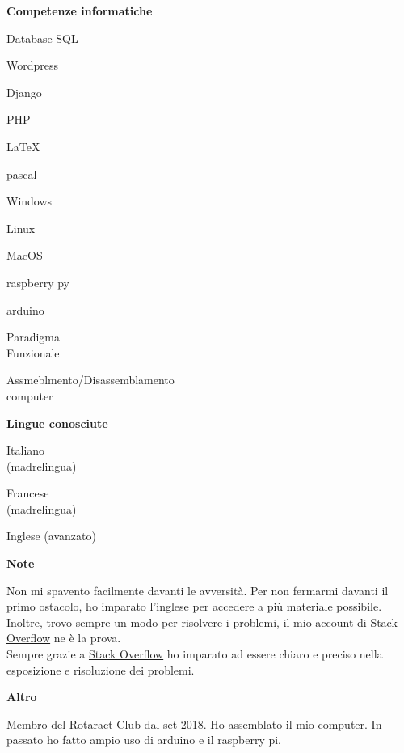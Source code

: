 \documentclass[a4paper,12pt,final]{memoir}
\newcommand{\Sep}{\vspace{1.5em}}
\newcommand{\SmallSep}{\vspace{0.5em}}
\newcommand{\CVSection}[1]
	{\Large\textbf{#1}\par
	\SmallSep\normalsize\normalfont}
\newcommand{\CVItem}[1]
	{\textbf{\color{RoyalBlue} #1}}
\begin{document}
\CVItem{Competenze informatiche}
\begin{multicols}{3}
\begin{compactitem}[\color{RoyalBlue}$\circ$]
	\item Database SQL
	\item Wordpress
	\item Django
	\item PHP
	\item \LaTeX
	\item pascal
	\item Windows
	\item Linux
	\item MacOS
	\item raspberry py
	\item arduino
	\item Paradigma\\Funzionale
	\item Assmeblmento/Disassemblamento\\computer
\end{compactitem}
\end{multicols}
\SmallSep

\clearpage
\framebreak
\framebreak

\CVItem{Lingue conosciute}
\begin{multicols}{3}
\begin{compactitem}[\color{RoyalBlue}$\circ$]
	\item Italiano\\(madrelingua)
	\item Francese\\(madrelingua)
	\item Inglese (avanzato)
\end{compactitem}
\end{multicols}
\Sep 

\CVSection{Note}
	Non mi spavento facilmente davanti le avversità.
	Per non fermarmi davanti il primo ostacolo, ho imparato l'inglese per accedere a più materiale possibile.
	\\Inoltre, trovo sempre un modo per risolvere i problemi, il mio account di \href{https://stackoverflow.com/users/6875945/mattia-rubini}{Stack Overflow} ne è la prova.
	\\Sempre grazie a \href{https://stackoverflow.com/users/6875945/mattia-rubini}{Stack Overflow} ho imparato ad essere chiaro e preciso nella esposizione e risoluzione dei problemi.

\CVSection{Altro}
	Membro del Rotaract Club dal set 2018.
	Ho assemblato il mio computer.
	In passato ho fatto ampio uso di arduino e il raspberry pi.
\Sep


\end{document}

